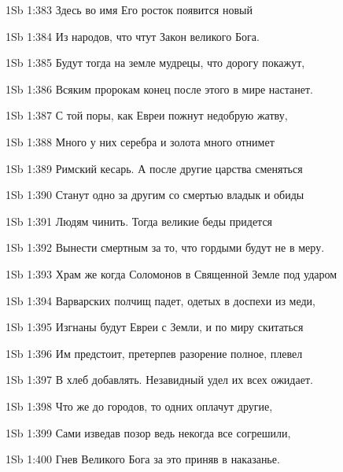 \vs 1Sb 1:383 Здесь во имя Его росток появится новый

\vs 1Sb 1:384 Из народов, что чтут Закон великого Бога.

\vs 1Sb 1:385 Будут тогда на земле мудрецы, что дорогу покажут,

\vs 1Sb 1:386 Всяким пророкам конец после этого в мире настанет.

\vs 1Sb 1:387 С той поры, как Евреи пожнут недобрую жатву,

\vs 1Sb 1:388 Много у них серебра и золота много отнимет

\vs 1Sb 1:389 Римский кесарь. А после другие царства сменяться

\vs 1Sb 1:390 Станут одно за другим со смертью владык и обиды

\vs 1Sb 1:391 Людям чинить. Тогда великие беды придется

\vs 1Sb 1:392 Вынести смертным за то, что гордыми будут не в меру.

\vs 1Sb 1:393 Храм же когда Соломонов в Священной Земле под ударом

\vs 1Sb 1:394 Варварских полчищ падет, одетых в доспехи из меди,

\vs 1Sb 1:395 Изгнаны будут Евреи с Земли, и по миру скитаться

\vs 1Sb 1:396 Им предстоит, претерпев разорение полное, плевел

\vs 1Sb 1:397 В хлеб добавлять. Незавидный удел их всех ожидает.

\vs 1Sb 1:398 Что же до городов, то одних оплачут другие,

\vs 1Sb 1:399 Сами изведав позор  ведь некогда все согрешили,

\vs 1Sb 1:400 Гнев Великого Бога за это приняв в наказанье.
